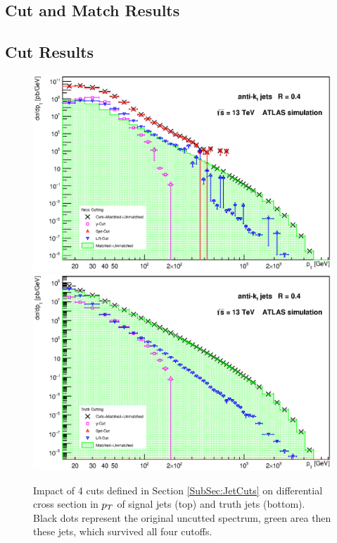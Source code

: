 \begin{appendices}

\chapter{Cut and Match Results}
\label{App:CutAndMatchingResults}

\newpage 

\section{Cut Results}
\label{sec:CutResults}

\begin{figure}[H]
  \centering
  \includegraphics[width=\textwidth]{Chapter3/SignalCutting.eps}
  \includegraphics[width=\textwidth]{Chapter3/TruthCutting.eps}
  \caption{Impact of 4 cuts defined in Section \ref{SubSec:JetCuts} on
  differential cross section in $p_{T}$ of signal jets (top) and truth jets
  (bottom). Black dots represent the original uncutted spectrum, green area then
  these jets, which survived all four cutoffs.}
  \label{fig:Cutting}
\end{figure}


\end{appendices}
